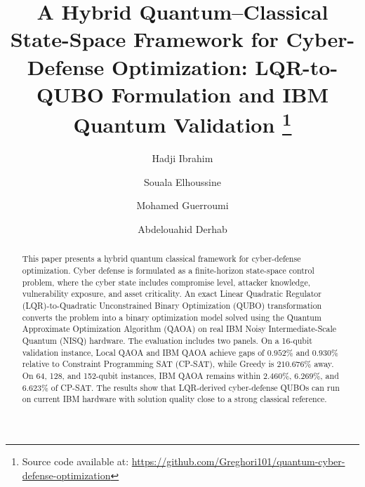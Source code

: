 \documentclass[runningheads]{llncs}
\begin{document}
\title{
A Hybrid Quantum--Classical State-Space Framework for Cyber-Defense Optimization:
LQR-to-QUBO Formulation and IBM Quantum Validation%
\thanks{\raggedright Source code available at:
\url{https://github.com/Greghori101/quantum-cyber-defense-optimization}}
}


\author{
Hadji Ibrahim \and
Souala Elhoussine \and
Mohamed Guerroumi \and
Abdelouahid Derhab
}



\maketitle

\begin{abstract}
This paper presents a hybrid quantum classical framework for cyber-defense optimization. Cyber defense is formulated as a finite-horizon state-space control problem, where the cyber state includes compromise level, attacker knowledge, vulnerability exposure, and asset criticality. An exact Linear Quadratic Regulator (LQR)-to-Quadratic Unconstrained Binary Optimization (QUBO) transformation converts the problem into a binary optimization model solved using the Quantum Approximate Optimization Algorithm (QAOA) on real IBM Noisy Intermediate-Scale Quantum (NISQ) hardware. The evaluation includes two panels. On a 16-qubit validation instance, Local QAOA and IBM QAOA achieve gaps of $0.952\%$ and $0.930\%$ relative to Constraint Programming SAT (CP-SAT), while Greedy is $210.676\%$ away. On 64, 128, and 152-qubit instances, IBM QAOA remains within $2.460\%$, $6.269\%$, and $6.623\%$ of CP-SAT. The results show that LQR-derived cyber-defense QUBOs can run on current IBM hardware with solution quality close to a strong classical reference.

\end{abstract}
\end{document}
